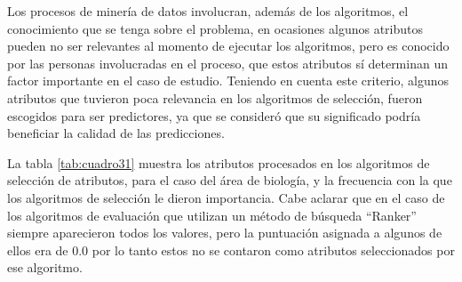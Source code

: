 Los procesos de minería de datos involucran, además de los algoritmos, el conocimiento que se tenga sobre el problema, en ocasiones algunos atributos pueden no ser relevantes al momento de ejecutar los algoritmos, pero es conocido por las personas involucradas en el proceso, que estos atributos sí determinan un factor importante en el caso de estudio. Teniendo en cuenta este criterio, algunos atributos que tuvieron poca relevancia en los algoritmos de selección, fueron escogidos para ser predictores, ya que se consideró que su significado podría beneficiar la calidad de las predicciones.

La tabla \ref{tab:cuadro31} muestra los atributos procesados en los algoritmos de selección de atributos, para el caso del área de biología, y la frecuencia con la que los algoritmos de selección le dieron importancia. Cabe aclarar que en el caso de los algoritmos de evaluación que utilizan un método de búsqueda “Ranker” siempre aparecieron todos los valores, pero la puntuación asignada a algunos de ellos era de 0.0 por lo tanto estos no se contaron como atributos seleccionados por ese algoritmo.

